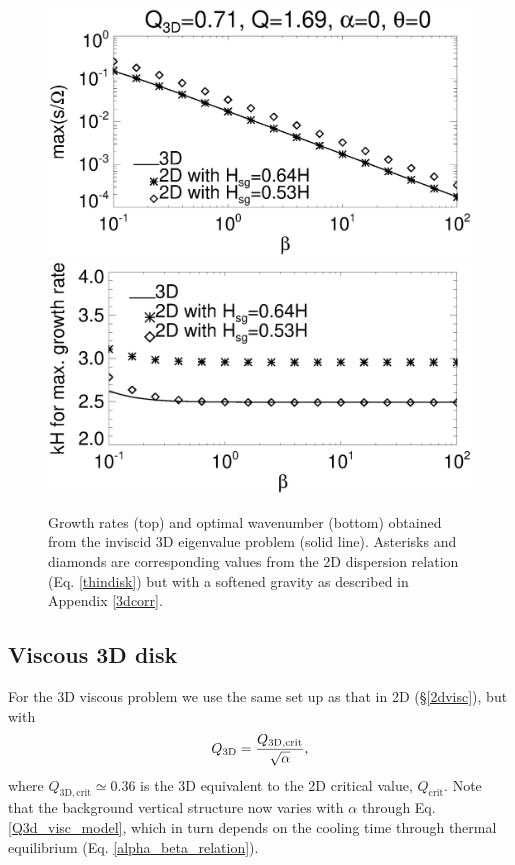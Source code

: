 \begin{figure}
  \includegraphics[width=\linewidth,clip=true,trim=0cm 2cm 0.cm
    0.0cm]{figures/3d_inviscid_rates}\\
  \includegraphics[width=\linewidth,clip=true,trim=0cm 0cm 0.cm
    0.8cm]{figures/3d_inviscid_kmax}
  \caption{Growth rates (top) and optimal wavenumber (bottom) obtained
    from the inviscid 3D eigenvalue problem (solid line). Asterisks
    and diamonds are corresponding values from the 2D dispersion
    relation (Eq. \ref{thindisk}) but with a softened gravity as
    described in Appendix \ref{3dcorr}. \label{3d_inviscid}} 
\end{figure}

\subsection{Viscous 3D disk} %
For the 3D viscous problem we use the same set up as that in 2D
(\S\ref{2dvisc}), but with 
\begin{align}
  Q_\mathrm{3D} = \frac{Q_\mathrm{3D,crit}}{\sqrt{\alpha}}, \label{Q3d_visc_model}
\end{align}
where $Q_\mathrm{3D,crit}\simeq0.36$ is the 3D equivalent to the 2D
critical value, $Q_\mathrm{crit}$. Note that the background vertical
structure now varies with $\alpha$ through Eq. \ref{Q3d_visc_model},
which in turn depends on the cooling time through thermal
equilibrium (Eq. \ref{alpha_beta_relation}). 

